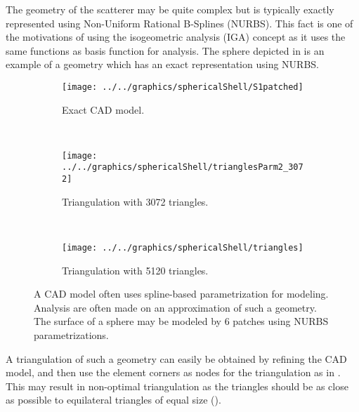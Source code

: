 The geometry of the scatterer may be quite complex but is typically exactly represented using Non-Uniform Rational B-Splines (NURBS). This fact is one of the motivations of using the isogeometric analysis (IGA) concept as it uses the same functions as basis function for analysis. The sphere depicted in  is an example of a geometry which has an exact representation using NURBS.
\begin{figure}
	\centering
	\begin{subfigure}[t]{0.3\textwidth}
		\centering
		\texttt{[image: ../../graphics/sphericalShell/S1patched]}
		\caption{Exact CAD model.}
		\label{Fig4:SphericalShellCAD}
	\end{subfigure}
	~
	\begin{subfigure}[t]{0.3\textwidth}
		\centering
		\texttt{[image: ../../graphics/sphericalShell/trianglesParm2\_3072]}
		\caption{Triangulation with 3072 triangles.}
		\label{Fig4:SphericalShellTriangles1}
	\end{subfigure}
	~
	\begin{subfigure}[t]{0.3\textwidth}
		\centering
		\texttt{[image: ../../graphics/sphericalShell/triangles]}
		\caption{Triangulation with 5120 triangles.}
		\label{Fig4:SphericalShellTriangles2}
	\end{subfigure}
	\caption{A CAD model often uses spline-based parametrization for modeling. Analysis are often made on an approximation of such a geometry. The surface of a sphere may be modeled by 6 patches using NURBS parametrizations.}
	\label{Fig4:SphericalShell}
\end{figure} 
A triangulation of such a geometry can easily be obtained by refining the CAD model, and then use the element corners as nodes for the triangulation as in . This may result in non-optimal triangulation as the triangles should be as close as possible to equilateral triangles of equal size (). 

